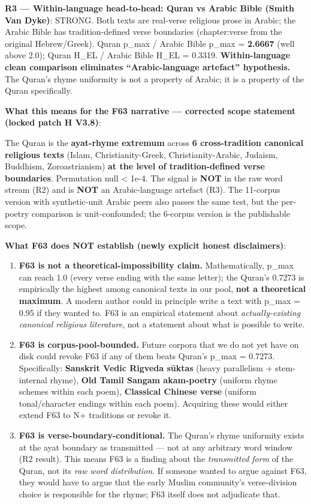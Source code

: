 \documentclass[
]{article}
\begin{document}
\textbf{R3 --- Within-language head-to-head: Quran vs Arabic Bible
(Smith Van Dyke)}: STRONG. Both texts are real-verse religious prose in
Arabic; the Arabic Bible has tradition-defined verse boundaries
(chapter:verse from the original Hebrew/Greek). Quran p\_max / Arabic
Bible p\_max = \textbf{2.6667} (well above 2.0); Quran H\_EL / Arabic
Bible H\_EL = 0.3319. \textbf{Within-language clean comparison
eliminates ``Arabic-language artefact'' hypothesis.} The Quran's rhyme
uniformity is not a property of Arabic; it is a property of the Quran
specifically.

\textbf{What this means for the F63 narrative --- corrected scope
statement (locked patch H V3.8)}:

The Quran is the \textbf{ayat-rhyme extremum} across \textbf{6
cross-tradition canonical religious texts} (Islam, Christianity-Greek,
Christianity-Arabic, Judaism, Buddhism, Zoroastrianism) \textbf{at the
level of tradition-defined verse boundaries}. Permutation null
\textless{} 1e-4. The signal is \textbf{NOT} in the raw word stream (R2)
and is \textbf{NOT} an Arabic-language artefact (R3). The 11-corpus
version with synthetic-unit Arabic peers also passes the same test, but
the per-poetry comparison is unit-confounded; the 6-corpus version is
the publishable scope.

\textbf{What F63 does NOT establish (newly explicit honest
disclaimers)}:

\begin{enumerate}
\def\labelenumi{\arabic{enumi}.}
\item
  \textbf{F63 is not a theoretical-impossibility claim.} Mathematically,
  p\_max can reach 1.0 (every verse ending with the same letter); the
  Quran's 0.7273 is empirically the highest among canonical texts in our
  pool, \textbf{not a theoretical maximum}. A modern author could in
  principle write a text with p\_max = 0.95 if they wanted to. F63 is an
  empirical statement about \emph{actually-existing canonical religious
  literature}, not a statement about what is possible to write.
\item
  \textbf{F63 is corpus-pool-bounded.} Future corpora that we do not yet
  have on disk could revoke F63 if any of them beats Quran's p\_max =
  0.7273. Specifically: \textbf{Sanskrit Vedic Rigveda sūktas} (heavy
  parallelism + stem-internal rhyme), \textbf{Old Tamil Sangam
  akam-poetry} (uniform rhyme schemes within each poem),
  \textbf{Classical Chinese verse} (uniform tonal/character endings
  within each poem). Acquiring these would either extend F63 to N+
  traditions or revoke it.
\item
  \textbf{F63 is verse-boundary-conditional.} The Quran's rhyme
  uniformity exists at the ayat boundary as transmitted --- not at any
  arbitrary word window (R2 result). This means F63 is a finding about
  the \emph{transmitted form} of the Quran, not its \emph{raw word
  distribution}. If someone wanted to argue against F63, they would have
  to argue that the early Muslim community's verse-division choice is
  responsible for the rhyme; F63 itself does not adjudicate that.
\end{enumerate}
\end{document}
